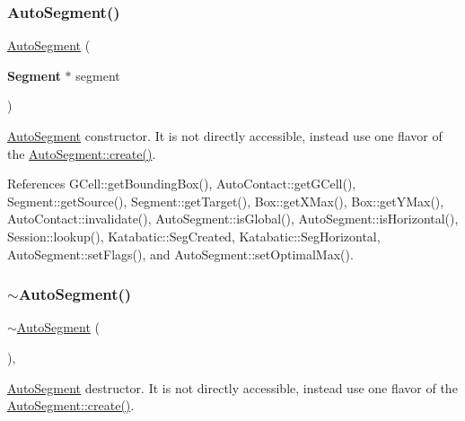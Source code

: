 \subsubsection{\texorpdfstring{Auto\+Segment()}{AutoSegment()}}
{\footnotesize\ttfamily \hyperlink{classKatabatic_1_1AutoSegment}{Auto\+Segment} (\begin{DoxyParamCaption}\item[{\textbf{ Segment} $\ast$}]{segment }\end{DoxyParamCaption})\hspace{0.3cm}{\ttfamily [protected]}}

\hyperlink{classKatabatic_1_1AutoSegment}{Auto\+Segment} constructor. It is not directly accessible, instead use one flavor of the \hyperlink{classKatabatic_1_1AutoSegment_ab0cc9e57beeceec519cd4bd3e415569e}{Auto\+Segment\+::create()}. 

References G\+Cell\+::get\+Bounding\+Box(), Auto\+Contact\+::get\+G\+Cell(), Segment\+::get\+Source(), Segment\+::get\+Target(), Box\+::get\+X\+Max(), Box\+::get\+Y\+Max(), Auto\+Contact\+::invalidate(), Auto\+Segment\+::is\+Global(), Auto\+Segment\+::is\+Horizontal(), Session\+::lookup(), Katabatic\+::\+Seg\+Created, Katabatic\+::\+Seg\+Horizontal, Auto\+Segment\+::set\+Flags(), and Auto\+Segment\+::set\+Optimal\+Max().

\mbox{\label{classKatabatic_1_1AutoSegment_a5d135025de0c1725d6252099c2e70e2b}} 
\subsubsection{\texorpdfstring{$\sim$\+Auto\+Segment()}{~AutoSegment()}}
{\footnotesize\ttfamily $\sim$\hyperlink{classKatabatic_1_1AutoSegment}{Auto\+Segment} (\begin{DoxyParamCaption}{ }\end{DoxyParamCaption})\hspace{0.3cm}{\ttfamily [protected]}, {\ttfamily [virtual]}}

\hyperlink{classKatabatic_1_1AutoSegment}{Auto\+Segment} destructor. It is not directly accessible, instead use one flavor of the \hyperlink{classKatabatic_1_1AutoSegment_ab0cc9e57beeceec519cd4bd3e415569e}{Auto\+Segment\+::create()}. 

